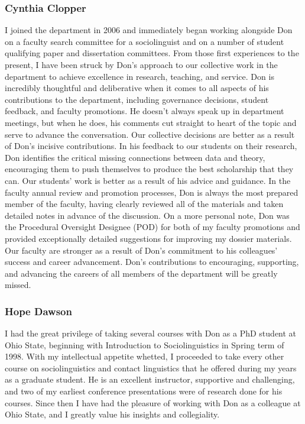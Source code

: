 \documentclass[output=paper, colorlinks,citecolor=brown]{langscibook}
\begin{document}
\subsubsection{Cynthia Clopper}
I joined the department in 2006 and immediately began working alongside Don on a faculty search committee for a sociolinguist and on a number of student qualifying paper and dissertation committees. From those first experiences to the present, I have been struck by Don’s approach to our collective work in the department to achieve excellence in research, teaching, and service. Don is incredibly thoughtful and deliberative when it comes to all aspects of his contributions to the department, including governance decisions, student feedback, and faculty promotions. He doesn’t always speak up in department meetings, but when he does, his comments cut straight to heart of the topic and serve to advance the conversation. Our collective decisions are better as a result of Don’s incisive contributions. In his feedback to our students on their research, Don identifies the critical missing connections between data and theory, encouraging them to push themselves to produce the best scholarship that they can. Our students’ work is better as a result of his advice and guidance. In the faculty annual review and promotion processes, Don is always the most prepared member of the faculty, having clearly reviewed all of the materials and taken detailed notes in advance of the discussion. On a more personal note, Don was the Procedural Oversight Designee (POD) for both of my faculty promotions and provided exceptionally detailed suggestions for improving my dossier materials. Our faculty are stronger as a result of Don’s commitment to his colleagues’ success and career advancement. Don’s contributions to encouraging, supporting, and advancing the careers of all members of the department will be greatly missed. 

\subsubsection{Hope Dawson}
I had the great privilege of taking several courses with Don as a PhD student at Ohio State, beginning with Introduction to Sociolinguistics in Spring term of 1998. With my intellectual appetite whetted, I proceeded to take every other course on sociolinguistics and contact linguistics that he offered during my years as a graduate student. He is an excellent instructor, supportive and challenging, and two of my earliest conference presentations were of research done for his courses. Since then I have had the pleasure of working with Don as a colleague at Ohio State, and I greatly value his insights and collegiality.
\end{document}

